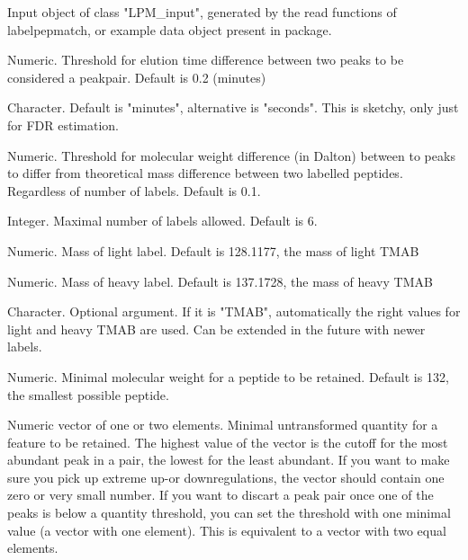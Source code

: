 \documentclass[letterpaper]{book}
\begin{document}
\begin{Arguments}
\begin{ldescription}
\item[\code{lpm\_input}] Input object of class "LPM\_input", generated by the read functions of labelpepmatch, or example data object present in package.

\item[\code{elutionthresh}] Numeric. Threshold for elution time difference between two peaks to be considered a peakpair. Default is 0.2 (minutes)

\item[\code{elutionunit}] Character. Default is "minutes", alternative is "seconds". This is sketchy, only just for FDR estimation.

\item[\code{labelthresh}] Numeric. Threshold for molecular weight difference (in Dalton) between to peaks to differ from theoretical mass difference between two labelled peptides. Regardless of number of labels. Default is 0.1.

\item[\code{labelcountmax}] Integer. Maximal number of labels allowed. Default is 6.

\item[\code{labellightmass}] Numeric. Mass of light label. Default is 128.1177, the mass of light TMAB

\item[\code{labelheavymass}] Numeric. Mass of heavy label. Default is 137.1728, the mass of heavy TMAB

\item[\code{label}] Character. Optional argument. If it is "TMAB", automatically the right values for light and heavy TMAB are used. Can be extended in the future with newer labels.

\item[\code{minmolweight}] Numeric. Minimal molecular weight for a peptide to be retained. Default is 132, the smallest possible peptide.

\item[\code{quantmin}] Numeric vector of one or two elements. Minimal untransformed quantity for a feature to be retained. The highest value of the vector is the cutoff for the most abundant peak in a pair, the lowest for the least abundant. If you want to make sure you pick up extreme up-or downregulations, the vector should contain one zero or very small number. If you want to discart a peak pair once one of the peaks is below a quantity threshold, you can set the threshold with one minimal value (a vector with one element). This is equivalent to a vector with two equal elements.


\end{ldescription}
\end{Arguments}
\end{document}
